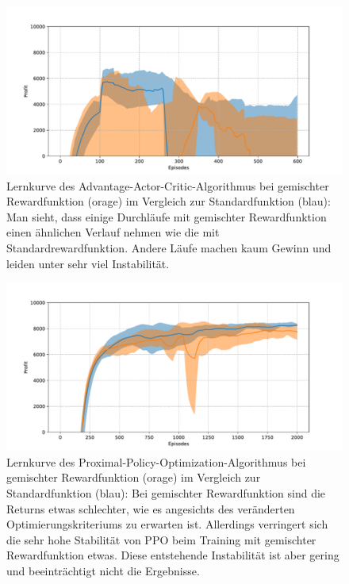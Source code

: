 \begin{figure}[htb]
	\centering
	\includegraphics[width=\textwidth]{appendix/mixed_rewards_a2c.pdf}
	\caption{
		Lernkurve des Advantage-Actor-Critic-Algorithmus bei gemischter Rewardfunktion (orage) im Vergleich zur Standardfunktion (blau):
		Man sieht, dass einige Durchläufe mit gemischter Rewardfunktion einen ähnlichen Verlauf nehmen wie die mit Standardrewardfunktion.
		Andere Läufe machen kaum Gewinn und leiden unter sehr viel Instabilität.
	}
	\label{graphic:MixedRewardsA2C}
\end{figure}
\begin{figure}[htb]
	\centering
	\includegraphics[width=\textwidth]{appendix/mixed_rewards_ppo.pdf}
	\caption{
		Lernkurve des Proximal-Policy-Optimization-Algorithmus bei gemischter Rewardfunktion (orage) im Vergleich zur Standardfunktion (blau):
		Bei gemischter Rewardfunktion sind die Returns etwas schlechter, wie es angesichts des veränderten Optimierungskriteriums zu erwarten ist.
		Allerdings verringert sich die sehr hohe Stabilität von PPO beim Training mit gemischter Rewardfunktion etwas.
		Diese entstehende Instabilität ist aber gering und beeinträchtigt nicht die Ergebnisse.
	}
	\label{graphic:MixedRewardsPPO}
\end{figure}
